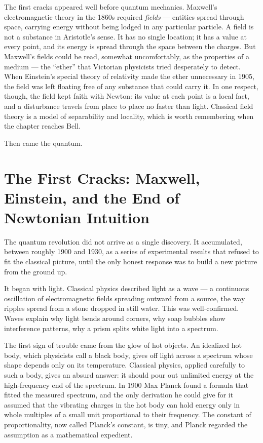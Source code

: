 The first cracks appeared well before quantum mechanics. Maxwell's electromagnetic theory in the 1860s required \emph{fields} --- entities spread through space, carrying energy without being lodged in any particular particle. A field is not a substance in Aristotle's sense. It has no single location; it has a value at every point, and its energy is spread through the space between the charges. But Maxwell's fields could be read, somewhat uncomfortably, as the properties of a medium --- the ``ether'' that Victorian physicists tried desperately to detect. When Einstein's special theory of relativity made the ether unnecessary in 1905, the field was left floating free of any substance that could carry it. In one respect, though, the field kept faith with Newton: its value at each point is a local fact, and a disturbance travels from place to place no faster than light. Classical field theory is a model of separability and locality, which is worth remembering when the chapter reaches Bell.

Then came the quantum.

\section{The First Cracks: Maxwell, Einstein, and the End of Newtonian Intuition}
\label{sec:ch1-cracks}

The quantum revolution did not arrive as a single discovery. It accumulated, between roughly 1900 and 1930, as a series of experimental results that refused to fit the classical picture, until the only honest response was to build a new picture from the ground up.

It began with light. Classical physics described light as a wave --- a continuous oscillation of electromagnetic fields spreading outward from a source, the way ripples spread from a stone dropped in still water. This was well-confirmed. Waves explain why light bends around corners, why soap bubbles show interference patterns, why a prism splits white light into a spectrum.

The first sign of trouble came from the glow of hot objects. An idealized hot body, which physicists call a black body, gives off light across a spectrum whose shape depends only on its temperature. Classical physics, applied carefully to such a body, gives an absurd answer: it should pour out unlimited energy at the high-frequency end of the spectrum. In 1900 Max Planck found a formula that fitted the measured spectrum, and the only derivation he could give for it assumed that the vibrating charges in the hot body can hold energy only in whole multiples of a small unit proportional to their frequency. The constant of proportionality, now called Planck's constant, is tiny, and Planck regarded the assumption as a mathematical expedient.

